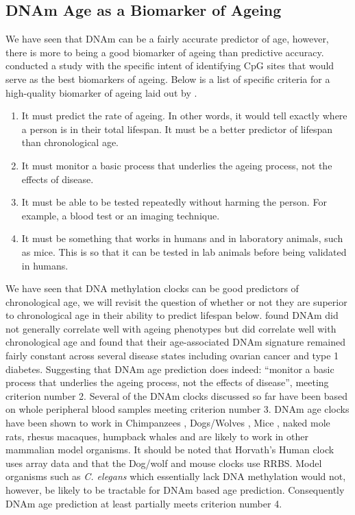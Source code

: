 \documentclass[]{book}
\providecommand{\tightlist}{%
  \setlength{\itemsep}{0pt}\setlength{\parskip}{0pt}}
\begin{document}
\hypertarget{dnam-age-as-a-biomarker-of-ageing}{%
\subsection{DNAm Age as a Biomarker of Ageing}\label{dnam-age-as-a-biomarker-of-ageing}}

We have seen that DNAm can be a fairly accurate predictor of age, however, there is more to being a good biomarker of ageing than predictive accuracy. \citet{Weidner2014} conducted a study with the specific intent of identifying CpG sites that would serve as the best biomarkers of ageing. Below is a list of specific criteria for a high-quality biomarker of ageing laid out by \citet{Johnson2006}.

\begin{enumerate}
\def\labelenumi{\arabic{enumi}.}
\tightlist
\item
  It must predict the rate of ageing. In other words, it would tell exactly where a person is in their total lifespan. It must be a better predictor of lifespan than chronological age.
\item
  It must monitor a basic process that underlies the ageing process, not the effects of disease.
\item
  It must be able to be tested repeatedly without harming the person. For example, a blood test or an imaging technique.
\item
  It must be something that works in humans and in laboratory animals, such as mice. This is so that it can be tested in lab animals before being validated in humans.
\end{enumerate}

We have seen that DNA methylation clocks can be good predictors of chronological age, we will revisit the question of whether or not they are superior to chronological age in their ability to predict lifespan below. \citet{Bell2012} found DNAm did not generally correlate well with ageing phenotypes but did correlate well with chronological age and \citet{Teschendorff2010} found that their age-associated DNAm signature remained fairly constant across several disease states including ovarian cancer and type 1 diabetes. Suggesting that DNAm age prediction does indeed: ``monitor a basic process that underlies the ageing process, not the effects of disease'', meeting criterion number 2. Several of the DNAm clocks discussed so far have been based on whole peripheral blood samples meeting criterion number 3. DNAm age clocks have been shown to work in Chimpanzees \citep{Horvath2013}, Dogs/Wolves \citep{Thompson2017}, Mice \citep{Stubbs2017}, naked mole rats, rhesus macaques, humpback whales \citep{Lowe2018} and are likely to work in other mammalian model organisms. It should be noted that Horvath's Human clock uses array data and that the Dog/wolf and mouse clocks use RRBS. Model organisms such as \emph{C. elegans} which essentially lack DNA methylation would not, however, be likely to be tractable for DNAm based age prediction. Consequently DNAm age prediction at least partially meets criterion number 4.
\end{document}
